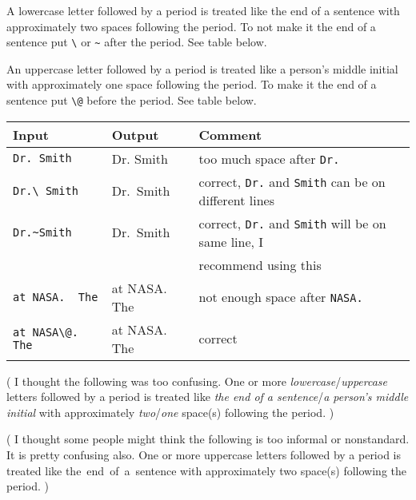 A lowercase letter followed by a period
is treated like the end of a sentence
with approximately two spaces following the period.
To not make it the end of a sentence put \verb+\+
or \verb+~+ after the period.
See table below.

An uppercase letter followed by a period
is treated like a person's middle initial
with approximately one space following the period.
To make it the end of a sentence put \verb+\@+
before the period.
See table below.

\begin{singlespace}
  \begin{tabular}{@{}lll@{}}
    \toprule
    \bfseries Input& \bfseries Output& \bfseries Comment\\
    \midrule
    \noalign{\vspace{2pt}}
    \verb+Dr. Smith+& Dr. Smith& too much space after \verb+Dr.+\\
    \verb+Dr.\ Smith+& Dr.\ Smith& correct, \verb+Dr.+ and \verb+Smith+ can be on different lines\\
    \verb+Dr.~Smith+& Dr.~Smith& correct, \verb+Dr.+ and \verb+Smith+ will be on same line, I\\
    & & recommend using this\\
    \noalign{\vspace{6pt}}
    \verb+at NASA.  The+& at NASA.  The& not enough space after \verb+NASA.+\\
    \verb+at NASA\@.  The+& at NASA\@.  The& correct\\
    \bottomrule
  \end{tabular}
  \index{\verb*+\ +}
\end{singlespace}

\vspace{\baselineskip}

(%
  I thought the following was too confusing.
  One or more \emph{lowercase}/\emph{uppercase}
  letters followed by a period
  is treated like
  \emph{the end of a sentence}/\emph{a person's middle initial}
  with approximately
  \emph{two}/\emph{one}
  space(s) following the period.%
)

(%
  I thought some people might think the following
  is too informal or nonstandard.
  It is pretty confusing also.
  One or more
  \hbox{}%
  \hbox{\small uppercase}
  letters followed by a period
  is treated like
  \hbox{}%
  \hbox{\small the end of a sentence}
  \noindent with approximately
  \hbox{\small {}}%
  \hbox{\small two}
  space(s) following the period.%
)


